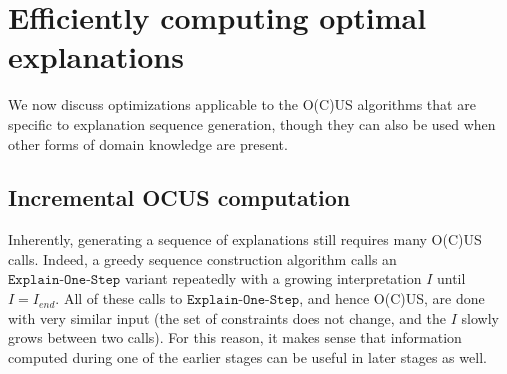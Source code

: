 \documentclass[twoside,11pt]{article}
\newcommand\m[1]{\mathcal{#1}}
\newcommand\Iend{\ensuremath{I_\mathit{end} }\xspace}
\newcommand\formulac{\ensuremath{\m{C} }\xspace}
\newcommand\mm[1]{\ensuremath{#1}\xspace}
\newcommand\call[1]{\mm{\texttt{#1}}}
\newcommand\omus{\mm{\call{OUS}}}
\newcommand\onestep{\ensuremath{\call{Explain-One-Step}}\xspace}
\begin{document}
\section{Efficiently computing optimal explanations}\label{sec:efficient-ocus}




We now discuss optimizations applicable to the O(C)US algorithms that are specific to explanation sequence generation, though they can also be used when other forms of domain knowledge are present. 

\subsection{Incremental OCUS computation}\label{sec:ocusEx}
Inherently, generating a sequence of explanations still requires many O(C)US calls. 
Indeed, a greedy sequence construction algorithm %
calls an \onestep variant repeatedly with a growing interpretation $I$ until $I=\Iend$.
%
All of these calls to \onestep, and hence O(C)US, are done with very similar input (the set of constraints does not change, and the $I$ slowly grows between two calls). For this reason, it makes sense that information computed during one of the earlier stages can be useful in later stages as well. 
\end{document}
